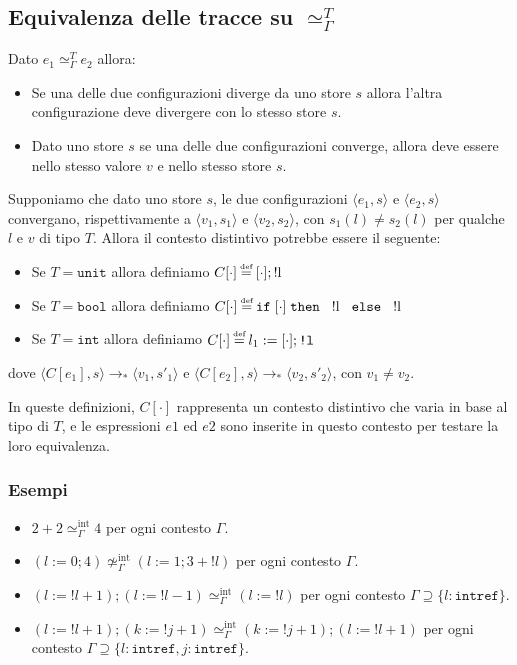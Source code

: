 \subsection{Equivalenza delle tracce su $\simeq_\Gamma^T$}
Dato $e_1 \simeq_\Gamma^T e_2$ allora:
\begin{itemize}
    \item Se una delle due configurazioni diverge da uno store $s$ allora 
    l'altra configurazione deve divergere con lo stesso store $s$.
    \item Dato uno store $s$ se una delle due configurazioni converge, allora 
    deve essere nello stesso valore $v$ e nello stesso store $s$.
\end{itemize}
Supponiamo che dato uno store $s$, le due configurazioni $\langle e_1, s \rangle$ e
$\langle e_2, s \rangle$ convergano, rispettivamente a $\langle v_1, s_1 \rangle$ e
$\langle v_2, s_2 \rangle$, con $s_1(l) \neq s_2(l)$ per qualche
$l$ e $v$ di tipo $T$. Allora il contesto distintivo potrebbe essere il seguente:
\begin{itemize}
    \item Se \( T = \texttt{unit} \) allora definiamo \( C[\cdot] \defeq [\cdot];
    \text{!l} \)
    \item Se \( T = \texttt{bool} \) allora definiamo \( C[\cdot] \defeq \texttt{if}
    \; [\cdot] \; \text{\texttt{then } !l \texttt{ else } !l} \)
    \item Se \( T = \texttt{int} \) allora definiamo \( C[\cdot] \defeq {l_1}
    := [\cdot]; \texttt{!l} \)
\end{itemize}
dove \( \langle C[e_1], s \rangle \rightarrow_* \langle v_1, s'_1 \rangle \) e \( \langle
    C[e_2], s \rangle \rightarrow_* \langle v_2, s'_2 \rangle \), con \( v_1 \neq v_2 \).

In queste definizioni, \( C[\cdot] \) rappresenta un contesto distintivo che
varia in base al tipo di \( T \), e le espressioni \( e1 \) ed \( e2 \) sono
inserite in questo contesto per testare la loro equivalenza.

\subsubsection{Esempi}
\begin{itemize}
    \item $2 + 2 \simeq_\Gamma^{\text{int}} 4$ per ogni contesto $\Gamma$.
    \item $(l:=0;4) \not \simeq_\Gamma^{\text{int}} (l:=1;3+!l)$ per ogni contesto $\Gamma$.
    \item $(l:=!l+1);(l:=!l-1) \simeq_\Gamma^{\text{int}} (l:=!l)$ per ogni contesto $\Gamma
    \supseteq \{l : \texttt{intref}\}$.
    \item $(l:=!l+1);(k:=!j + 1) \simeq_\Gamma^{\text{int}} (k:=!j + 1);(l:=!l+1)$ per
    ogni contesto $\Gamma \supseteq \{l : \texttt{intref}, j : \texttt{intref}\}$.
\end{itemize}

